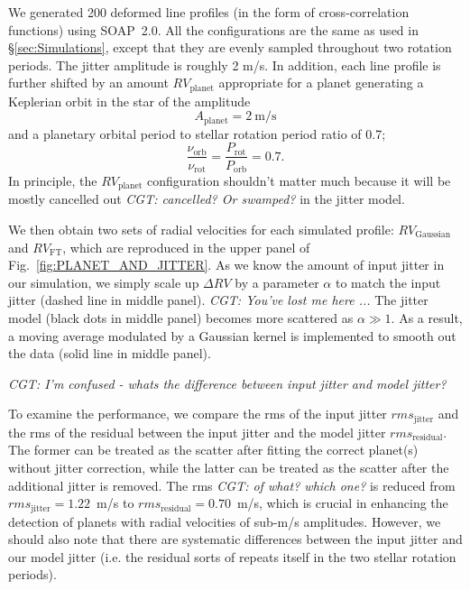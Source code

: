 We generated 200 deformed line profiles (in the form of cross-correlation functions) using SOAP~2.0. All the configurations are the same as used in \S\ref{sec:Simulations}, except that they are evenly sampled throughout two rotation periods. The jitter amplitude is roughly 2 m/s. In addition, each line profile is further shifted by an amount $RV_\text{planet}$ appropriate for a planet generating a Keplerian orbit in the star of  the amplitude
\begin{equation*}
	A_\text{planet} = 2~\text{m/s}
\end{equation*}
and a planetary orbital period to stellar rotation period ratio of 0.7;
\begin{equation*}
	\frac{\nu_\text{orb}}{\nu_\text{rot}} = \frac{P_\text{rot}}{P_\text{orb}} = 0.7.
\end{equation*}
In principle, the $RV_\text{planet}$ configuration shouldn't matter much 
because it will be mostly cancelled out {\em CGT: cancelled? Or swamped?} in the jitter model. 

We then obtain two sets of radial velocities for each simulated profile: 
$RV_\text{Gaussian}$ and $RV_\text{FT}$, which are reproduced in the upper panel of Fig.~\ref{fig:PLANET_AND_JITTER}. 
As we know the amount of input jitter in our simulation, we simply scale up $\Delta RV$ by a parameter $\alpha$
to match the input jitter (dashed line in middle panel). {\em CGT: You've lost me here ...}
The jitter model (black dots in middle panel) becomes more scattered as $\alpha \gg 1$.  
As a result, a moving average modulated by a Gaussian kernel is implemented to smooth out the data (solid line 
in middle panel).

{\em CGT: I'm confused - whats the difference between input jitter and model jitter?}

To examine the performance, we compare the rms of the input jitter $rms_\text{jitter}$
and the rms of the residual between the input jitter and the model jitter $rms_\text{residual}$. 
The former can be treated as the scatter after fitting the correct planet(s) without jitter correction, 
while the latter can be treated as the scatter after the additional jitter is removed.
The rms {\em CGT: of what? which one?} is reduced from $rms_\text{jitter} = 1.22$~m/s to $rms_\text{residual} = 0.70$~m/s,
which is crucial in enhancing the detection of planets with radial velocities of sub-m/s amplitudes. 
However, we should also note that there are systematic differences between the input jitter and our model jitter
(i.e. the residual sorts of repeats itself in the two stellar rotation periods). 

